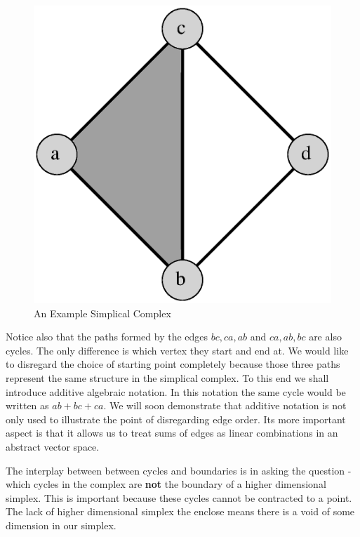 \begin{figure}[h]%
    \centering
    \includegraphics[scale=0.4]{./images/chapter1/homology-sc.eps}%
    \caption{An Example Simplical Complex}%
    \label{fig:hom-sc}%
\end{figure}




Notice also that the paths formed by the edges $bc, ca, ab$ and $ca, ab, bc$ are also cycles. The only difference is which vertex they start and end at. We would like to disregard the choice of starting point completely because those three paths represent the same structure in the simplical complex. To this end we shall introduce additive algebraic notation. In this notation the same cycle would be written as $ab + bc + ca$.  We will soon demonstrate that additive notation is not only used to illustrate the point of disregarding edge order. Its more important aspect is that it allows us to treat sums of edges as linear combinations in an abstract vector space.

The interplay between between cycles and boundaries is in asking the question - which cycles in the complex are \textbf{not} the boundary of a higher dimensional simplex. This is important because these cycles cannot be contracted to a point. The lack of higher dimensional simplex the enclose means there is a void of some dimension in our simplex.

